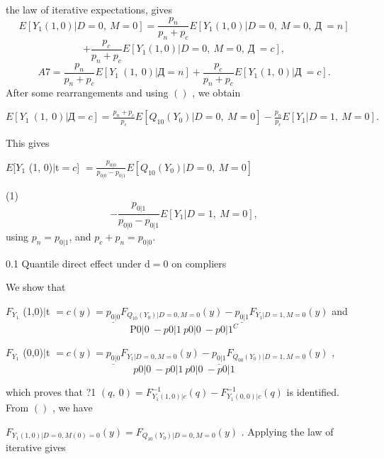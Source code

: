 \documentclass[a4paper,12pt]{article}
\begin{document}
the law of iterative expectations, gives
$$
E[Y_{1}(1,0)|D=0,\ M=0]=\frac{p_{n}}{p_{n}+p_{c}}E[Y_{1}(1,0)|D=0,\ M=0,\ Д\ =n]
$$
$$
+\frac{p_{c}}{p_{n}+p_{c}}E[Y_{1}(1,0)|D=0,\ M=0,\ Д\ =c],
$$
$$
A7=\frac{p_{n}}{p_{n}+p_{c}}E[Y_{1}\ (1,\ 0)|Д=n]+\frac{p_{c}}{p_{n}+p_{c}}E[Y_{1}(1,\ 0)|Д\ =c].
$$
After some rearrangements and using $()$ , we obtain

$E[Y_{1}\displaystyle \ (1,\ 0)|Д=c]=\frac{p_{n}+p_{c}}{p_{c}}E[Q_{10}(Y_{0})|D=0,\ M=0]-\frac{p_{n}}{p_{c}}E[Y_{1}|D=1,\ M=0].$

This gives
\begin{center}
$E$[$Y_{1}$ (1, 0)$|$t$=c$] $=\displaystyle \frac{p_{0|0}}{p_{0|0}-p_{0|1}}E[Q_{10}(Y_{0})|D=0,\ M=0]$
\end{center}
(1)
$$
-\frac{p_{0|1}}{p_{0|0}-p_{0|1}}E[Y_{1}|D=1,\ M=0],
$$
using $p_{n}=p_{0|1}$, and $p_{c}+p_{n}=p_{0|0}.$

0.1 Quantile direct effect under $\mathrm{d}=0$ on compliers

We show that

$F_{Y_{1}}$ (1,0)$|$t $=c(y) = \underline{p_{0|0}}F_{Q_{10}(Y_{0})|D=0,M=0}(y) - \underline{p_{0|1}}F_{Y_{1}|D=1,M=0}(y)$ and
$$
\mathrm{P}0|0\ -p0|1\ p0|0\ -p0|1^{C}
$$
\begin{center}
$F_{Y_{1}}$ (0,0)$|$t $=c(y) = \underline{p_{0|0}}F_{Y_{1}|D=0,M=0}(y) - \underline{p_{0|1}}F_{Q_{00}(Y_{0})|D=1,M=0}(y)$ ,
$$
p0|0\ -p0|1\ p0|0\ -p0|1
$$
\end{center}
which proves that ?1 $(q,\ 0)=F_{Y_{1}(1,0)|c}^{-1}(q)-F_{Y_{1}(0,0)|c}^{-1}(q)$ is identified. From $()$ , we have

$F_{Y_{1}(1,0)|D=0,M(0)=0}(y)=F_{Q_{10}(Y_{0})|D=0,M=0}(y)$ . Applying the law of iterative gives
\end{document}
